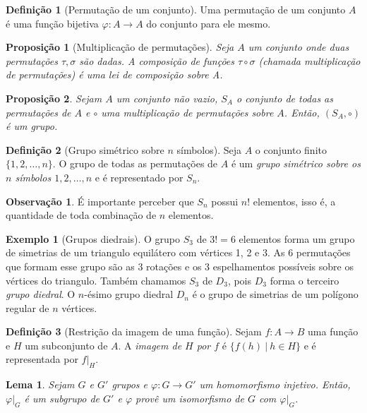 \documentclass[a4paper,12pt]{report}
\theoremstyle{plain}
\newtheorem{lema}{Lema}[section]
\newtheorem{proposicao}{Proposição}[section]
\theoremstyle{definition}
\newtheorem{definicao}{Definição}[section]
\newtheorem{observacao}{Observação}[section]
\newtheorem{exemplo}{Exemplo}[section]
\begin{document}
\begin{definicao}[Permutação de um conjunto]
		Uma permutação de um conjunto $A$ é uma função bijetiva $\varphi: A \longrightarrow A$ do conjunto para ele mesmo.
\end{definicao}

\begin{proposicao}[Multiplicação de permutações]\label{def:multpermut}
	Seja $A$ um conjunto onde duas permutações $\tau,\sigma$ são dadas. A composição de funções $\tau\circ\sigma$ (chamada \emph{multiplicação de permutações}) é uma lei de composição sobre A.
\end{proposicao}

\begin{proposicao}
	Sejam $A$ um conjunto não vazio, $S_A$ o conjunto de todas as permutações de $A$ e $\circ$ uma multiplicação de permutações sobre $A$. Então, $(S_A, \circ)$ é um grupo.
\end{proposicao}

\begin{definicao}[Grupo simétrico sobre $n$ símbolos]
	Seja $A$ o conjunto finito $\{1,2,\dots, n\}$. O grupo de todas as permutações de $A$ é um \emph{grupo simétrico sobre os $n$ símbolos $1,2,\dots,n$} e é representado por $S_n$.	
\end{definicao}

\begin{observacao}
	É importante perceber que $S_n$ possui $n!$ elementos, isso é, a quantidade de toda combinação de $n$ elementos.
\end{observacao}

\begin{exemplo}[Grupos diedrais]
	O grupo $S_3$ de $3! = 6$ elementos forma um grupo de simetrias de um triangulo equilátero com vértices 1, 2 e 3. As 6 permutações que formam esse grupo são as 3 rotações e os 3 espelhamentos possíveis sobre os vértices do triangulo. Também chamamos $S_3$ de $D_3$, pois $D_3$ forma o terceiro \emph{grupo diedral}. 
	O $n$-ésimo grupo diedral $D_n$ é o grupo de simetrias de um polígono regular de $n$ vértices.
\end{exemplo}

\begin{definicao}[Restrição da imagem de uma função]
	Sejam $f: A\longrightarrow B$ uma função e $H$ um subconjunto de $A$. A \emph{imagem de $H$ por $f$} é $\{f(h)\ |\ h \in H\}$ e é representada por $f|_H$.
\end{definicao}

\begin{lema}
	Sejam $G$ e $G'$ grupos e $\varphi:G\longrightarrow G'$ um homomorfismo injetivo. Então, $\varphi|_G$ é um subgrupo de $G'$ e $\varphi$ provê um isomorfismo de $G$ com $\varphi|_G$.
\end{lema}
\end{document}
